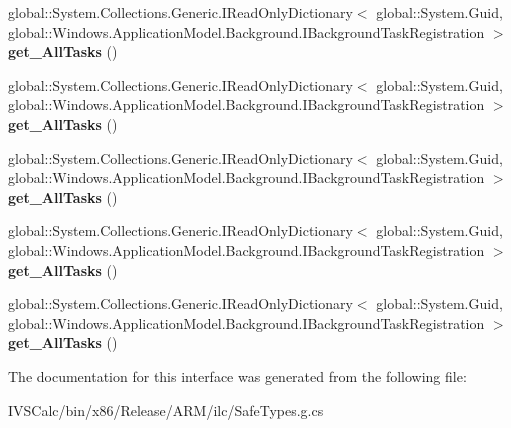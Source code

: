 \begin{DoxyCompactItemize}
\item 
\mbox{\label{interface_windows_1_1_application_model_1_1_background_1_1_i_background_task_registration_statics_a890b3ead297e8785c68812041350d54e}} 
global\+::\+System.\+Collections.\+Generic.\+I\+Read\+Only\+Dictionary$<$ global\+::\+System.\+Guid, global\+::\+Windows.\+Application\+Model.\+Background.\+I\+Background\+Task\+Registration $>$ {\bfseries get\+\_\+\+All\+Tasks} ()
\item 
\mbox{\label{interface_windows_1_1_application_model_1_1_background_1_1_i_background_task_registration_statics_a890b3ead297e8785c68812041350d54e}} 
global\+::\+System.\+Collections.\+Generic.\+I\+Read\+Only\+Dictionary$<$ global\+::\+System.\+Guid, global\+::\+Windows.\+Application\+Model.\+Background.\+I\+Background\+Task\+Registration $>$ {\bfseries get\+\_\+\+All\+Tasks} ()
\item 
\mbox{\label{interface_windows_1_1_application_model_1_1_background_1_1_i_background_task_registration_statics_a890b3ead297e8785c68812041350d54e}} 
global\+::\+System.\+Collections.\+Generic.\+I\+Read\+Only\+Dictionary$<$ global\+::\+System.\+Guid, global\+::\+Windows.\+Application\+Model.\+Background.\+I\+Background\+Task\+Registration $>$ {\bfseries get\+\_\+\+All\+Tasks} ()
\item 
\mbox{\label{interface_windows_1_1_application_model_1_1_background_1_1_i_background_task_registration_statics_a890b3ead297e8785c68812041350d54e}} 
global\+::\+System.\+Collections.\+Generic.\+I\+Read\+Only\+Dictionary$<$ global\+::\+System.\+Guid, global\+::\+Windows.\+Application\+Model.\+Background.\+I\+Background\+Task\+Registration $>$ {\bfseries get\+\_\+\+All\+Tasks} ()
\item 
\mbox{\label{interface_windows_1_1_application_model_1_1_background_1_1_i_background_task_registration_statics_a890b3ead297e8785c68812041350d54e}} 
global\+::\+System.\+Collections.\+Generic.\+I\+Read\+Only\+Dictionary$<$ global\+::\+System.\+Guid, global\+::\+Windows.\+Application\+Model.\+Background.\+I\+Background\+Task\+Registration $>$ {\bfseries get\+\_\+\+All\+Tasks} ()
\end{DoxyCompactItemize}


The documentation for this interface was generated from the following file\+:\begin{DoxyCompactItemize}
\item 
I\+V\+S\+Calc/bin/x86/\+Release/\+A\+R\+M/ilc/Safe\+Types.\+g.\+cs\end{DoxyCompactItemize}
